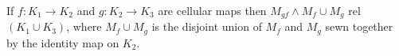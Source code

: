 If $f: K_1 \to K_2$ and $g: K_2 \to K_3$ are cellular maps then $M_{gf} \wedge M_f \cup M_g$ rel $(K_1 \cup K_3)$, where $M_f \cup M_g$ is the disjoint union of $M_f$ and $M_g$ sewn together by the identity map on $K_2$.
